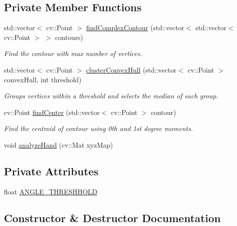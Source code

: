 \subsection*{Private Member Functions}
\begin{DoxyCompactItemize}
\item 
std\+::vector$<$ cv\+::\+Point $>$ \hyperlink{class_hand_a836fa2da6d128e2db7eca7e4965d0a2d}{find\+Complex\+Contour} (std\+::vector$<$ std\+::vector$<$ cv\+::\+Point $>$ $>$ contours)
\begin{DoxyCompactList}\small\item\em Find the contour with max number of vertices. \end{DoxyCompactList}\item 
std\+::vector$<$ cv\+::\+Point $>$ \hyperlink{class_hand_ad7b1c8745ec41d551945e75e75961f85}{cluster\+Convex\+Hull} (std\+::vector$<$ cv\+::\+Point $>$ convex\+Hull, int threshold)
\begin{DoxyCompactList}\small\item\em Groups vertices within a threshold and selects the median of each group. \end{DoxyCompactList}\item 
cv\+::\+Point \hyperlink{class_hand_ab089502dd52e8251c5a9efadac2784dd}{find\+Center} (std\+::vector$<$ cv\+::\+Point $>$ contour)
\begin{DoxyCompactList}\small\item\em Find the centroid of contour using 0th and 1st degree moments. \end{DoxyCompactList}\item 
void \hyperlink{class_hand_a0a58ac8e96eab17c99f820f0a4075275}{analyze\+Hand} (cv\+::\+Mat xyz\+Map)
\end{DoxyCompactItemize}
\subsection*{Private Attributes}
\begin{DoxyCompactItemize}
\item 
float \hyperlink{class_hand_aae06e06e724346861df0a7fdddcfc3c8}{A\+N\+G\+L\+E\+\_\+\+T\+H\+R\+E\+S\+H\+H\+O\+LD}
\end{DoxyCompactItemize}


\subsection{Constructor \& Destructor Documentation}
\hypertarget{class_hand_aa733faf150351c640fc7d1bf460b07e9}{}\label{class_hand_aa733faf150351c640fc7d1bf460b07e9} 
